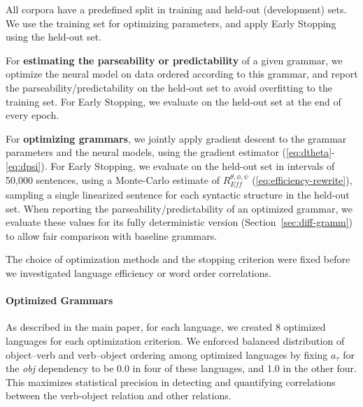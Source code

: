 \documentclass[10pt,twoside,lineno]{article}
\newcommand{\key}[1]{\textbf{#1}}
\begin{document}
All corpora have a predefined split in training and held-out (development) sets.
We use the training set for optimizing parameters, and apply Early Stopping~\citep{prechelt1998early} using the held-out set.

For \key{estimating the parseability or predictability} of a given grammar, we optimize the neural model on data ordered according to this grammar, and report the parseability/predictability on the held-out set to avoid overfitting to the training set.
For Early Stopping, we evaluate on the held-out set at the end of every epoch. %

For \key{optimizing grammars}, we jointly apply gradient descent to the grammar parameters and the neural models, using the gradient estimator (\ref{eq:dtheta}-\ref{eq:dpsi}).
For Early Stopping, we evaluate on the held-out set in intervals of 50,000 sentences, using a Monte-Carlo estimate of $R_{\textit{Eff}}^{\theta, \phi, \psi}$ (\ref{eq:efficiency-rewrite}), sampling a single linearized sentence for each syntactic structure in the held-out set.
When reporting the parseability/predictability of an optimized grammar, we evaluate these values for its fully deterministic version (Section~\ref{sec:diff-gramm}) to allow fair comparison with baseline grammars.


The choice of optimization methods and the stopping criterion were fixed before we investigated language efficiency or word order correlations.

\paragraph{Optimized Grammars}
As described in the main paper, for each language, we created 8 optimized languages for each optimization criterion.
We enforced balanced distribution of object--verb and verb--object ordering among optimized languages by fixing $a_\tau$ for the \textit{obj} dependency to be 0.0 in four of these languages, and 1.0 in the other four.
This maximizes statistical precision in detecting and quantifying correlations between the verb-object relation and other relations.
\end{document}

